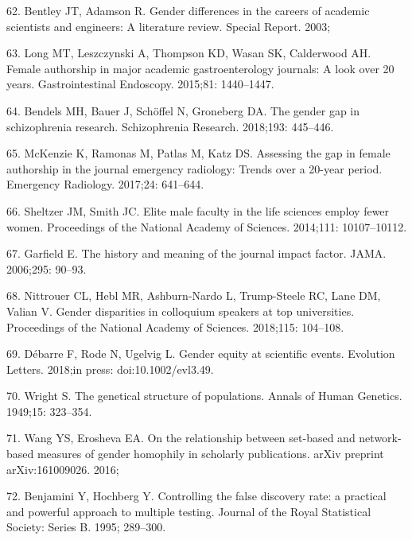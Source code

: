 \documentclass[12pt,]{article}
\begin{document}
\leavevmode\hypertarget{ref-Bentley_2003}{}%
62. Bentley JT, Adamson R. Gender differences in the careers of academic
scientists and engineers: A literature review. Special Report. 2003;

\leavevmode\hypertarget{ref-Long_2015}{}%
63. Long MT, Leszczynski A, Thompson KD, Wasan SK, Calderwood AH. Female
authorship in major academic gastroenterology journals: A look over 20
years. Gastrointestinal Endoscopy. 2015;81: 1440--1447.

\leavevmode\hypertarget{ref-Bendels_2018}{}%
64. Bendels MH, Bauer J, Schöffel N, Groneberg DA. The gender gap in
schizophrenia research. Schizophrenia Research. 2018;193: 445--446.

\leavevmode\hypertarget{ref-McKenzie_2017}{}%
65. McKenzie K, Ramonas M, Patlas M, Katz DS. Assessing the gap in
female authorship in the journal emergency radiology: Trends over a
20-year period. Emergency Radiology. 2017;24: 641--644.

\leavevmode\hypertarget{ref-sheltzer_2014}{}%
66. Sheltzer JM, Smith JC. Elite male faculty in the life sciences
employ fewer women. Proceedings of the National Academy of Sciences.
2014;111: 10107--10112.

\leavevmode\hypertarget{ref-Garfield_2006}{}%
67. Garfield E. The history and meaning of the journal impact factor.
JAMA. 2006;295: 90--93.

\leavevmode\hypertarget{ref-nittrouer_2018}{}%
68. Nittrouer CL, Hebl MR, Ashburn-Nardo L, Trump-Steele RC, Lane DM,
Valian V. Gender disparities in colloquium speakers at top universities.
Proceedings of the National Academy of Sciences. 2018;115: 104--108.

\leavevmode\hypertarget{ref-debarre_2018}{}%
69. Débarre F, Rode N, Ugelvig L. Gender equity at scientific events.
Evolution Letters. 2018;in press: doi:10.1002/evl3.49.

\leavevmode\hypertarget{ref-wright_1949}{}%
70. Wright S. The genetical structure of populations. Annals of Human
Genetics. 1949;15: 323--354.

\leavevmode\hypertarget{ref-wang_2016}{}%
71. Wang YS, Erosheva EA. On the relationship between set-based and
network-based measures of gender homophily in scholarly publications.
arXiv preprint arXiv:161009026. 2016;

\leavevmode\hypertarget{ref-Benjamini_1995}{}%
72. Benjamini Y, Hochberg Y. Controlling the false discovery rate: a
practical and powerful approach to multiple testing. Journal of the
Royal Statistical Society: Series B. 1995; 289--300.
\end{document}
